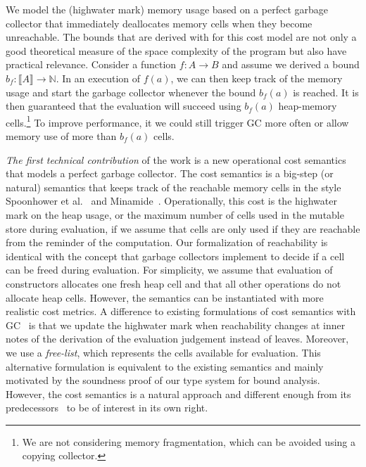\documentclass{easychair}
\newcommand{\denote}[1]{\llbracket#1\rrbracket}
\theoremstyle{definition}
\begin{document}
We model the (highwater mark) memory
usage based on a perfect garbage collector that immediately
deallocates memory cells when they become unreachable. The bounds that
are derived with for this cost model are not only a good theoretical
measure of the space complexity of the program but also have practical
relevance. Consider a function $f : A \to B$ and assume we derived a
bound $b_f : \denote{A} \to \mathbb{N}$. In an execution of $f(a)$, we
can then keep track of the memory usage and start the garbage
collector whenever the bound $b_f(a)$ is reached. It is then
guaranteed that the evaluation will succeed using $b_f(a)$ heap-memory
cells.\footnote{We are not considering memory fragmentation, which
  can be avoided using a copying collector.} To improve performance,
it we could still trigger GC more often or allow memory use of more
than $b_f(a)$ cells.

\emph{The first technical contribution} of the work is a new
operational cost semantics that models a perfect garbage collector.
%
The cost semantics is a big-step (or natural) semantics that keeps
track of the reachable memory cells in the style Spoonhower et
al.~\cite{Spoonhower:2008:SPP:1411204.1411240} and
Minamide~\cite{DBLP:journals/entcs/Minamide99}. Operationally, this
cost is the highwater mark on the heap usage, or the maximum number of
cells used in the mutable store during evaluation, if we assume that
cells are only used if they are reachable from the reminder of the
computation. Our formalization of reachability is identical with the
concept that garbage collectors implement to decide if a cell can be
freed during evaluation. For simplicity, we assume that evaluation of
constructors allocates one fresh heap cell and that all other
operations do not allocate heap cells. However, the semantics can be
instantiated with more realistic cost metrics. A difference to
existing formulations of cost semantics with
GC~\cite{Spoonhower:2008:SPP:1411204.1411240,DBLP:journals/entcs/Minamide99}
is that we update the highwater mark when reachability changes at
inner notes of the derivation of the evaluation judgement instead of
leaves. Moreover, we use a \emph{free-list}, which represents the
cells available for evaluation. This alternative formulation is
equivalent to the existing semantics and mainly motivated by the
soundness proof of our type system for bound analysis.  However, the
cost semantics is a natural approach and different enough from its
predecessors~\cite{Spoonhower:2008:SPP:1411204.1411240,DBLP:journals/entcs/Minamide99}
to be of interest in its own right.
\end{document}
